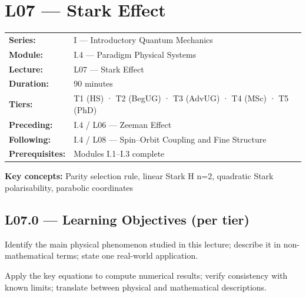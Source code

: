 \renewcommand{\lectureCode}{I.4 / L07}

\section*{L07 — Stark Effect}
\label{sec:L07}

\begin{tcolorbox}[lecturebox, title={Module I.4 / L07 — Metadata}]
\begin{tabular}{@{}ll@{}}
\textbf{Series:}    & I — Introductory Quantum Mechanics \\
\textbf{Module:}    & I.4 — Paradigm Physical Systems \\
\textbf{Lecture:}   & L07 — Stark Effect \\
\textbf{Duration:}  & 90 minutes \\
\textbf{Tiers:}     & T1 (HS) · T2 (BegUG) · T3 (AdvUG) · T4 (MSc) · T5 (PhD) \\
\textbf{Preceding:} & I.4 / L06 — Zeeman Effect \\
\textbf{Following:} & I.4 / L08 — Spin–Orbit Coupling and Fine Structure \\
\textbf{Prerequisites:} & Modules I.1–I.3 complete \\
\end{tabular}

\medskip
\textbf{Key concepts:} Parity selection rule, linear Stark H n=2, quadratic Stark polarisability, parabolic coordinates
\end{tcolorbox}

\subsection*{L07.0 — Learning Objectives (per tier)}
\label{sec:L07.0}

\quad
Identify the main physical phenomenon studied in this lecture; describe it in
non-mathematical terms; state one real-world application.

\quad
Apply the key equations to compute numerical results; verify consistency with
known limits; translate between physical and mathematical descriptions.

